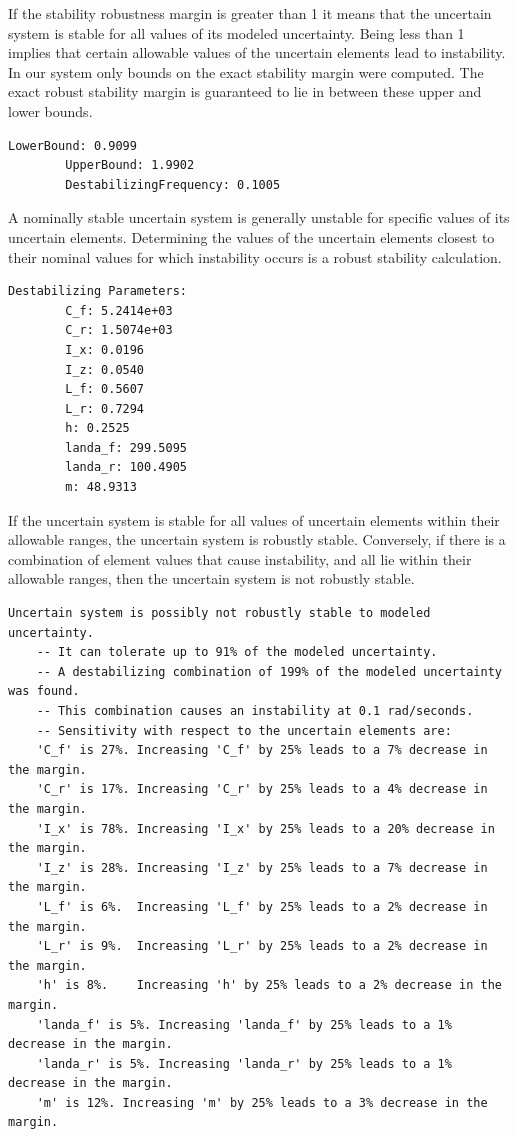 \newpage

If the stability robustness margin is greater than 1 it means that the uncertain system is stable for all values of its modeled uncertainty. Being less than 1 implies that certain allowable values of the uncertain elements lead to instability. In our system only bounds on the exact stability margin were computed. The exact robust stability margin is guaranteed to lie in between these upper and lower bounds.
\begin{lstlisting}[style=codematlab2]
		LowerBound: 0.9099
		UpperBound: 1.9902
		DestabilizingFrequency: 0.1005
\end{lstlisting}
A nominally stable uncertain system is generally unstable for specific values of its uncertain elements. Determining the values of the uncertain elements closest to their nominal values for which instability occurs is a robust stability calculation.
\begin{lstlisting}[style=codematlab2]
Destabilizing Parameters:
		C_f: 5.2414e+03
		C_r: 1.5074e+03
		I_x: 0.0196
		I_z: 0.0540
		L_f: 0.5607
		L_r: 0.7294
		h: 0.2525
		landa_f: 299.5095
		landa_r: 100.4905
		m: 48.9313
\end{lstlisting}

If the uncertain system is stable for all values of uncertain elements within their allowable ranges, the uncertain system is robustly stable. Conversely, if there is a combination of element values that cause instability, and all lie within their allowable ranges, then the uncertain system is not robustly stable.
\begin{lstlisting}[style=codematlab2,frame=single]
	Uncertain system is possibly not robustly stable to modeled uncertainty.
	-- It can tolerate up to 91% of the modeled uncertainty.
	-- A destabilizing combination of 199% of the modeled uncertainty was found.
	-- This combination causes an instability at 0.1 rad/seconds.
	-- Sensitivity with respect to the uncertain elements are:
	'C_f' is 27%. Increasing 'C_f' by 25% leads to a 7% decrease in the margin.
	'C_r' is 17%. Increasing 'C_r' by 25% leads to a 4% decrease in the margin.
	'I_x' is 78%. Increasing 'I_x' by 25% leads to a 20% decrease in the margin.
	'I_z' is 28%. Increasing 'I_z' by 25% leads to a 7% decrease in the margin.
	'L_f' is 6%.  Increasing 'L_f' by 25% leads to a 2% decrease in the margin.
	'L_r' is 9%.  Increasing 'L_r' by 25% leads to a 2% decrease in the margin.
	'h' is 8%.    Increasing 'h' by 25% leads to a 2% decrease in the margin.
	'landa_f' is 5%. Increasing 'landa_f' by 25% leads to a 1% decrease in the margin.
	'landa_r' is 5%. Increasing 'landa_r' by 25% leads to a 1% decrease in the margin.
	'm' is 12%. Increasing 'm' by 25% leads to a 3% decrease in the margin.
\end{lstlisting}

